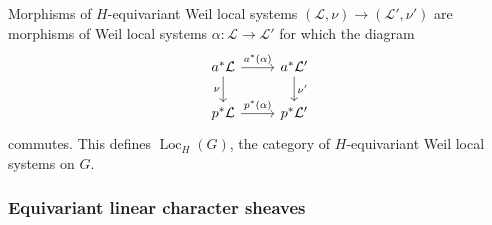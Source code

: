 \documentclass[10pt]{amsart}
\theoremstyle{plain}
\theoremstyle{definition}
\DeclareMathOperator{\Loc}{Loc}
\newcommand{\cs}[1]{{\mathcal{#1}}}
\begin{document}
Morphisms of $H$-equivariant Weil local systems $(\cs{L},\nu)\to (\cs{L}',\nu')$ are morphisms of Weil local systems $\alpha: \cs{L}\to \cs{L}'$ for which the diagram
\begin{equation}\label{E3}
\begin{tikzcd}
\arrow{d}[swap]{\nu} a^*\cs{L} \arrow{r}{a^*(\alpha)} & a^*\cs{L}' \arrow{d}{\nu'} \\
p^*\cs{L} \arrow{r}{p^*(\alpha)} & p^*\cs{L}'
\end{tikzcd}
\end{equation}
commutes.
This defines $\Loc_H(G)$, the category of $H$-equivariant Weil local systems on $G$.

\subsubsection{Equivariant linear character sheaves}\label{ssec:equivariant2}
\end{document}

